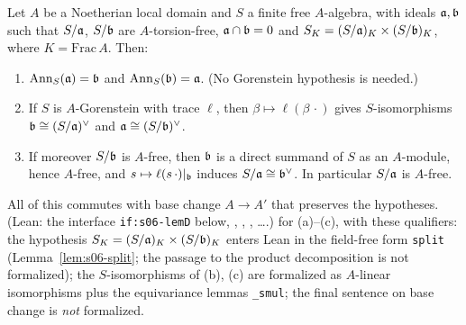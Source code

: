 \begin{lemma}\label{lem:s06-D}
Let $A$ be a Noetherian local domain and $S$ a finite free $A$-algebra, with ideals $\mathfrak{a},\mathfrak{b}$ such that $S/\mathfrak{a}$, $S/\mathfrak{b}$ are
$A$-torsion-free, $\mathfrak{a}\cap\mathfrak{b}=0$ and $S_K=(S/\mathfrak{a})_K\times(S/\mathfrak{b})_K$, where $K=\mathrm{Frac}\,A$. Then:
\begin{enumerate}[label=(\alph*)]
\item $\operatorname{Ann}_S(\mathfrak{a})=\mathfrak{b}$ and $\operatorname{Ann}_S(\mathfrak{b})=\mathfrak{a}$. (No Gorenstein hypothesis is needed.)
\item If $S$ is $A$-Gorenstein with trace $\ell$, then $\beta\mapsto\ell(\beta\,\cdot)$ gives $S$-isomorphisms
  $\mathfrak{b}\cong(S/\mathfrak{a})^\vee$ and $\mathfrak{a}\cong(S/\mathfrak{b})^\vee$.
\item If moreover $S/\mathfrak{b}$ is $A$-free, then $\mathfrak{b}$ is a direct summand of $S$ as an $A$-module, hence $A$-free, and
  $s\mapsto\ell(s\,\cdot)|_{\mathfrak{b}}$ induces $S/\mathfrak{a}\cong\mathfrak{b}^\vee$. In particular $S/\mathfrak{a}$ is $A$-free.
\end{enumerate}
All of this commutes with base change $A\to A'$ that preserves the hypotheses. \stproved{}
(Lean: the interface \texttt{if:s06-lemD} below, , , , \dots.)
\stformalized{} for (a)--(c), with these qualifiers: the hypothesis $S_K=(S/\mathfrak{a})_K\times(S/\mathfrak{b})_K$ enters Lean in the field-free form \texttt{split} (Lemma~\ref{lem:s06-split}; the passage to the product decomposition is not formalized); the $S$-isomorphisms of (b), (c) are formalized as $A$-linear isomorphisms plus the equivariance lemmas \texttt{\_smul}; the final sentence on base change is \emph{not} formalized.
\end{lemma}

